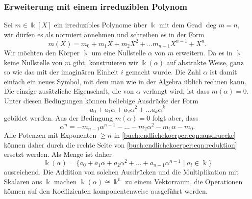 \subsubsection{Erweiterung mit einem irreduziblen Polynom}
Sei $m\in\Bbbk[X]$ ein irreduzibles Polynome über $\Bbbk$ mit dem Grad
$\deg m=n$,
wir dürfen es als normiert annehmen und schreiben es in der Form
\[
m(X)
=
m_0+m_1X+m_2X^2 + \dots m_{n-1}X^{n-1}+X^n.
\]
Wir möchten den Körper $\Bbbk$ um eine Nullstelle $\alpha$ von $m$
erweitern.
Da es in $\Bbbk$ keine Nullstelle von $m$ gibt, konstruieren wir
$\Bbbk(\alpha)$ auf abstrakte Weise, ganz so wie das mit der imaginären
Einheit $i$ gemacht wurde.
Die Zahl $\alpha$ ist damit einfach ein neues Symbol, mit dem man
wie in der Algebra üblich rechnen kann.
Die einzige zusätzliche Eigenschaft, die von $\alpha$ verlangt wird,
ist dass $m(\alpha)=0$.
Unter diesen Bedingungen können beliebige Ausdrücke der Form
\begin{equation}
a_0 + a_1\alpha + a_2\alpha^2 + \dots a_k\alpha^k
\label{buch:endlichekoerper:eqn:ausdruecke}
\end{equation}
gebildet werden.
Aus der Bedingung $m(\alpha)=0$ folgt aber, dass
\begin{equation}
\alpha^n = -m_{n-1}\alpha^{n-1} -\dots - m_2\alpha^2  - m_1\alpha - m_0.
\label{buch:endlichekoerper:eqn:reduktion}
\end{equation}
Alle Potenzen mit Exponenten $\ge n$ in
\eqref{buch:endlichekoerper:eqn:ausdruecke}
können daher durch die rechte Seite von
\eqref{buch:endlichekoerper:eqn:reduktion}
ersetzt werden.
Als Menge ist daher
\[
\Bbbk(\alpha)
=
\{
a_0+a_1\alpha+a_2\alpha^2+\dots+a_{n-1}\alpha^{n-1}\;|\; a_i\in\Bbbk\}
\]
ausreichend.
Die Addition von solchen Ausdrücken und die Multiplikation mit Skalaren
aus $\Bbbk$ machen $\Bbbk(\alpha)\cong \Bbbk^n$ zu einem Vektorraum,
die Operationen können auf den Koeffizienten komponentenweise ausgeführt
werden.

